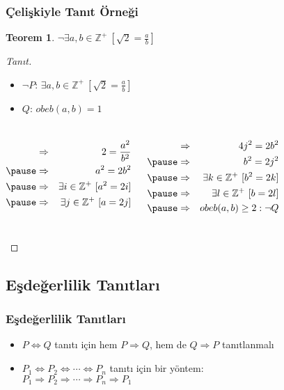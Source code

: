 \documentclass[dvipsnames]{beamer}
\theoremstyle{definition}
\theoremstyle{example}
\theoremstyle{plain}
\newtheorem{teorem}[theorem]{Teorem}
\begin{document}
\begin{frame}
  \frametitle{Çelişkiyle Tanıt Örneği}

  \begin{teorem}
    $\neg \exists a,b \in \mathbb{Z}^+~[\sqrt{2}=\frac{a}{b}]$
  \end{teorem}

  \pause
  \begin{proof}[Tanıt]
    \begin{itemize}
      \item $\neg P$: $\exists a,b \in \mathbb{Z}^+~[\sqrt{2}=\frac{a}{b}]$
      \item $Q$: $obeb(a,b)=1$
    \end{itemize}

    \pause
    \vspace{-0.7cm}
    \begin{columns}[t]
      \begin{eqnarray*}
        & \Rightarrow & 2 = \frac{a^2}{b^2}\\\pause
        & \Rightarrow & a^2 = 2b^2\\\pause
        & \Rightarrow & \exists i \in \mathbb{Z}^+~[a^2=2i]\\\pause
        & \Rightarrow & \exists j \in \mathbb{Z}^+~[a=2j]
      \end{eqnarray*}

      \pause
      \begin{eqnarray*}
        & \Rightarrow & 4j^2 = 2b^2\\\pause
        & \Rightarrow & b^2 = 2j^2\\\pause
        & \Rightarrow & \exists k \in \mathbb{Z}^+~[b^2=2k]\\\pause
        & \Rightarrow & \exists l \in \mathbb{Z}^+~[b=2l]\\\pause
        & \Rightarrow & obeb(a,b) \geq 2: \neg Q
      \end{eqnarray*}
    \end{columns}
  \end{proof}
\end{frame}

\subsection{Eşdeğerlilik Tanıtları}

\begin{frame}
  \frametitle{Eşdeğerlilik Tanıtları}

  \begin{itemize}
    \item $P \Leftrightarrow Q$ tanıtı için hem $P \Rightarrow Q$, hem de
      $Q \Rightarrow P$ tanıtlanmalı

    \pause
    \medskip
    \item $P_1 \Leftrightarrow P_2 \Leftrightarrow \cdots \Leftrightarrow P_n$
      tanıtı için bir yöntem:\\
      $P_1 \Rightarrow P_2 \Rightarrow \cdots \Rightarrow P_n \Rightarrow P_1$
  \end{itemize}
\end{frame}
\end{document}
